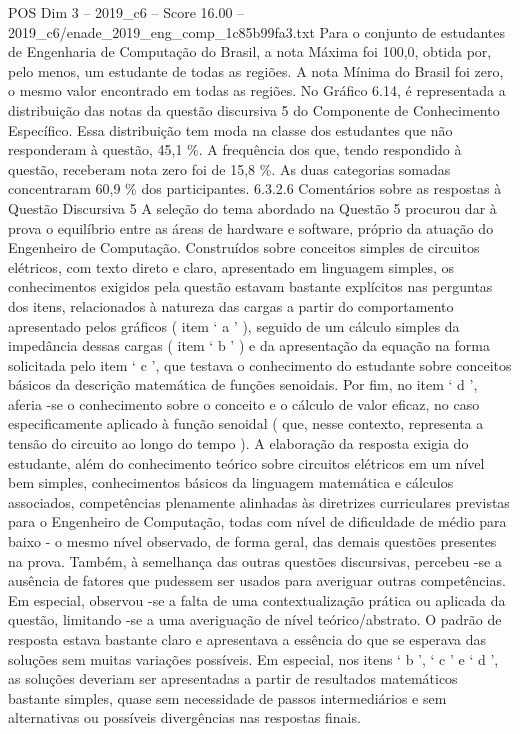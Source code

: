 \begin{textsample}{POS Dim 3 – 2019\_c6 – Score 16.00 – 2019\_c6/enade\_2019\_eng\_comp\_1c85b99fa3.txt}
Para o conjunto de estudantes de Engenharia de Computação do Brasil, a nota Máxima foi 100,0, obtida por, pelo menos, um estudante de todas as regiões.
A nota Mínima do Brasil foi zero, o mesmo valor encontrado em todas as regiões.
No Gráfico 6.14, é representada a distribuição das notas da questão discursiva 5 do Componente de Conhecimento Específico.
Essa distribuição tem moda na classe dos estudantes que não responderam à questão, 45,1 \%.
A frequência dos que, tendo respondido à questão, receberam nota zero foi de 15,8 \%.
As duas categorias somadas concentraram 60,9 \% dos participantes. 6.3.2.6 Comentários sobre as respostas à Questão Discursiva 5 A seleção do tema abordado na Questão 5 procurou dar à prova o equilíbrio entre as áreas de hardware e software, próprio da atuação do Engenheiro de Computação.
Construídos sobre conceitos simples de circuitos elétricos, com texto direto e claro, apresentado em linguagem simples, os conhecimentos exigidos pela questão estavam bastante explícitos nas perguntas dos itens, relacionados à natureza das cargas a partir do comportamento apresentado pelos gráficos ( item ‘ a ’ ), seguido de um cálculo simples da impedância dessas cargas ( item ‘ b ’ ) e da apresentação da equação na forma solicitada pelo item ‘ c ’, que testava o conhecimento do estudante sobre conceitos básicos da descrição matemática de funções senoidais.
Por fim, no item ‘ d ’, aferia -se o conhecimento sobre o conceito e o cálculo de valor eficaz, no caso especificamente aplicado à função senoidal ( que, nesse contexto, representa a tensão do circuito ao longo do tempo ).
A elaboração da resposta exigia do estudante, além do conhecimento teórico sobre circuitos elétricos em um nível bem simples, conhecimentos básicos da linguagem matemática e cálculos associados, competências plenamente alinhadas às diretrizes curriculares previstas para o Engenheiro de Computação, todas com nível de dificuldade de médio para baixo - o mesmo nível observado, de forma geral, das demais questões presentes na prova.
Também, à semelhança das outras questões discursivas, percebeu -se a ausência de fatores que pudessem ser usados para averiguar outras competências.
Em especial, observou -se a falta de uma contextualização prática ou aplicada da questão, limitando -se a uma averiguação de nível teórico/abstrato.
O padrão de resposta estava bastante claro e apresentava a essência do que se esperava das soluções sem muitas variações possíveis.
Em especial, nos itens ‘ b ’, ‘ c ’ e ‘ d ’, as soluções deveriam ser apresentadas a partir de resultados matemáticos bastante simples, quase sem necessidade de passos intermediários e sem alternativas ou possíveis divergências nas respostas finais.

\end{textsample}
